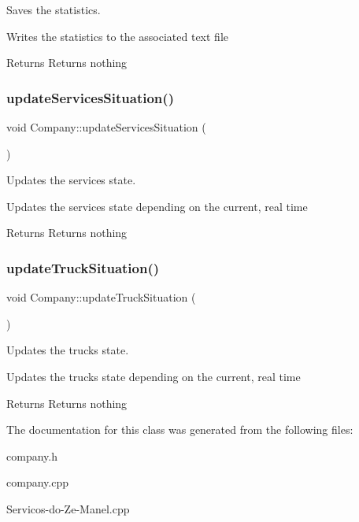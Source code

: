 Saves the statistics. 

Writes the statistics to the associated text file

\begin{DoxyReturn}{Returns}
Returns nothing 
\end{DoxyReturn}
\mbox{\label{class_company_ae5ce2e4c8d26951b71ca73c7589f6875}} 
\subsubsection{\texorpdfstring{update\+Services\+Situation()}{updateServicesSituation()}}
{\footnotesize\ttfamily void Company\+::update\+Services\+Situation (\begin{DoxyParamCaption}{ }\end{DoxyParamCaption})}



Updates the services\textquotesingle{} state. 

Updates the services\textquotesingle{} state depending on the current, real time

\begin{DoxyReturn}{Returns}
Returns nothing 
\end{DoxyReturn}
\mbox{\label{class_company_af058ee612ca75f1bbd6507e078e5de0a}} 
\subsubsection{\texorpdfstring{update\+Truck\+Situation()}{updateTruckSituation()}}
{\footnotesize\ttfamily void Company\+::update\+Truck\+Situation (\begin{DoxyParamCaption}{ }\end{DoxyParamCaption})}



Updates the truck\textquotesingle{}s state. 

Updates the truck\textquotesingle{}s state depending on the current, real time

\begin{DoxyReturn}{Returns}
Returns nothing 
\end{DoxyReturn}


The documentation for this class was generated from the following files\+:\begin{DoxyCompactItemize}
\item 
company.\+h\item 
company.\+cpp\item 
Servicos-\/do-\/\+Ze-\/\+Manel.\+cpp\end{DoxyCompactItemize}
